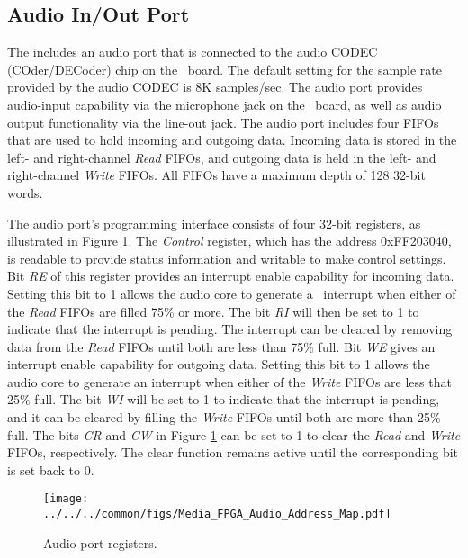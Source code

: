 \subsection{Audio In/Out Port}

The {\it \systemNameFull} includes an audio port that is connected to the audio CODEC
(COder/DECoder) chip on the \DEBoard~board. The default setting for the 
sample rate provided by the audio CODEC is 
8K samples/sec.  The audio port provides audio-input capability via the microphone 
jack on the \DEBoard~board, as well as audio output functionality via the line-out jack.  
The audio port includes four FIFOs that are used to hold incoming and outgoing data.
Incoming data is stored in the left- and right-channel {\it Read} FIFOs, and outgoing data
is held in the left- and right-channel {\it Write} FIFOs. All FIFOs have a maximum 
depth of 128 32-bit words.

The audio port's programming interface consists of four 32-bit registers, as illustrated in 
Figure \ref{fig:audio_port}.  The {\it Control} register, which has the address 
{\sf 0xFF203040}, is readable to provide status information and writable to make control
settings. Bit {\it RE} of this register provides an interrupt enable capability for
incoming data. Setting this bit to 1 allows the audio core to generate a \processor~interrupt
when either of the {\it Read} FIFOs are filled 75\% or more. The bit {\it RI} will then be
set to 1 to indicate that the interrupt is pending. The interrupt can be cleared by removing
data from the {\it Read} FIFOs until both are less than 75\% full. 
Bit {\it WE} gives an interrupt enable capability for outgoing data. Setting this bit to 
1 allows the audio core to generate an interrupt when either of the {\it Write} FIFOs are
less that 25\% full. The bit {\it WI} will be set to 1 to indicate that the interrupt 
is pending, and it can be cleared by filling the {\it Write} FIFOs until both 
are more than 25\% full.  The bits {\it CR} and {\it CW} in Figure \ref{fig:audio_port} can 
be set to 1 to clear the {\it Read} and {\it Write} FIFOs, respectively. The clear function 
remains active until the corresponding bit is set back to 0.

\begin{figure}[h!]
   \begin{center}
       \texttt{[image: ../../../common/figs/Media\_FPGA\_Audio\_Address\_Map.pdf]}
   \end{center}
   \caption{Audio port registers.}
	\label{fig:audio_port}
\end{figure}

